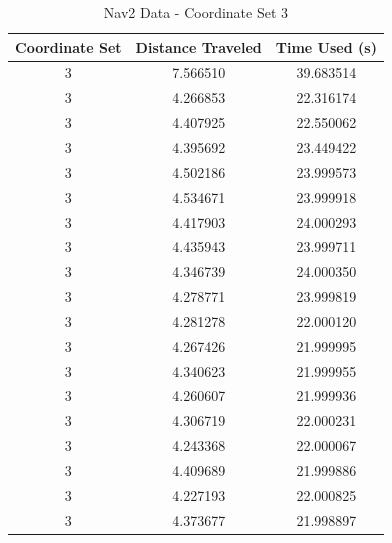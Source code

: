 \documentclass[]{article}
\begin{document}
	\begin{table}[h!]
		\centering
		\begin{tabular}{|c|c|c|}
			\hline
			Coordinate Set & Distance Traveled & Time Used (s) \\
			\hline
			3 & 7.566510 & 39.683514 \\
			3 & 4.266853 & 22.316174 \\
			3 & 4.407925 & 22.550062 \\
			3 & 4.395692 & 23.449422 \\
			3 & 4.502186 & 23.999573 \\
			3 & 4.534671 & 23.999918 \\
			3 & 4.417903 & 24.000293 \\
			3 & 4.435943 & 23.999711 \\
			3 & 4.346739 & 24.000350 \\
			3 & 4.278771 & 23.999819 \\
			3 & 4.281278 & 22.000120 \\
			3 & 4.267426 & 21.999995 \\
			3 & 4.340623 & 21.999955 \\
			3 & 4.260607 & 21.999936 \\
			3 & 4.306719 & 22.000231 \\
			3 & 4.243368 & 22.000067 \\
			3 & 4.409689 & 21.999886 \\
			3 & 4.227193 & 22.000825 \\
			3 & 4.373677 & 21.998897 \\
			\hline
		\end{tabular}
		\caption{Nav2 Data - Coordinate Set 3}
		\label{tab:4}
	\end{table}
	
\end{document}
